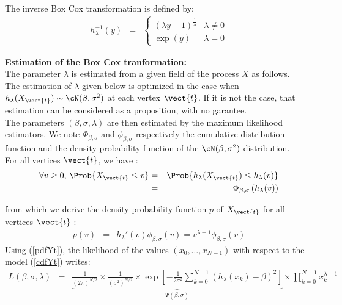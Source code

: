 The inverse Box Cox transformation is defined by:
\begin{eqnarray}
  \label{InverseBoxCoxModel}
  h^{-1}_\lambda(y) & = &
  \left\{
  \begin{array}{ll}
    \displaystyle (\lambda y + 1)^{\frac{1}{\lambda}} & \lambda \neq 0 \\
    \displaystyle \exp(y)                          & \lambda = 0
  \end{array}
  \right.
\end{eqnarray}
\vspace*{0.1cm}

{\bf Estimation of the Box Cox tranformation: }\\
The parameter $\lambda$ is estimated from a given field of the process $X$ as follows.\\
The estimation of $\lambda$ given below is optimized in the case when $h_\lambda(X_{\vect{t}}) \sim \cN(\beta , \sigma^2 )$ at each vertex $\vect{t}$. If it is not the case, that estimation can be considered as a proposition, with no garantee.\\
The parameters $(\beta,\sigma,\lambda)$ are then estimated by the maximum likelihood estimators. We note $\Phi_{\beta, \sigma}$ and $\phi_{\beta, \sigma}$ respectively the cumulative distribution function and the density probability function of the $\cN(\beta , \sigma^2)$ distribution.\\
For all vertices $\vect{t}$, we have :
\begin{eqnarray}\label{cdfYt}
  \forall v \geq 0, \, \Prob{ X_{\vect{t}} \leq v } & = & \Prob{ h_\lambda(X_{\vect{t}}) \leq h_\lambda(v) } \\
  & = & \Phi_{\beta, \sigma} \left(h_\lambda(v)\right)
\end{eqnarray}

from which we derive the  density probability function $p$ of $X_{\vect{t}}$ for all vertices $\vect{t}$ :
\begin{eqnarray}\label{pdfYt}
  p(v) & = & h_\lambda'(v)\phi_{\beta, \sigma}(v) = v^{\lambda - 1}\phi_{\beta, \sigma}(v)
\end{eqnarray}
Using (\ref{pdfYt}), the likelihood of the values $(x_0, \dots, x_{N-1})$ with respect to the model (\ref{cdfYt})  writes:
\begin{eqnarray}\label{LKH}
  L(\beta,\sigma,\lambda)
  & = &
  \underbrace{ \frac{1}{(2\pi)^{N/2}}
    \times
    \frac{1}{(\sigma^2)^{N/2}}
    \times
    \exp\left[
      -\frac{1}{2\sigma^2}
      \sum_{k=0}^{N-1}
      \left(
      h_\lambda(x_k)-\beta
      \right)^2
      \right]
  }_{\Psi(\beta, \sigma)}
  \times
  \prod_{k=0}^{N-1} x_k^{\lambda - 1}
\end{eqnarray}



